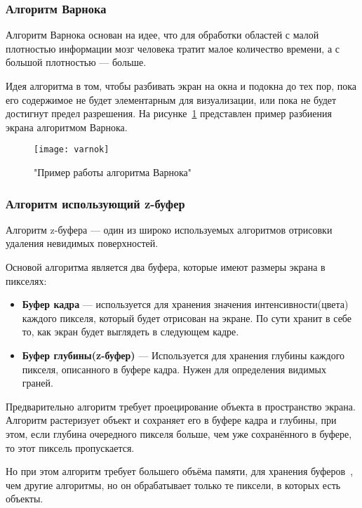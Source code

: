 \subsubsection{Алгоритм Варнока}

Алгоритм Варнока основан на идее, что для обработки областей с малой плотностью информации мозг человека тратит малое количество времени, а с большой плотностью — больше.

Идея алгоритма в том, чтобы разбивать экран на окна и подокна до тех пор, пока его содержимое не будет элементарным для визуализации, или пока не будет достигнут предел разрешения. На рисунке~\ref{fig:varnok} представлен пример разбиения экрана алгоритмом Варнока.

\begin{figure}[H]
	\centering
	\texttt{[image: varnok]}
	\caption{"Пример работы алгоритма Варнока"}
	\label{fig:varnok}
\end{figure}

\subsubsection{Алгоритм использующий z-буфер}
Алгоритм z-буфера — один из широко используемых алгоритмов отрисовки удаления невидимых поверхностей.

Основой алгоритма является два буфера, которые имеют размеры экрана в пикселях:

\begin{itemize}
	\item \textbf{Буфер кадра} — используется для хранения значения интенсивности(цвета) каждого пикселя, который будет отрисован на экране. По сути хранит в себе то, как экран будет выглядеть в следующем кадре.
	\item \textbf{Буфер глубины(z-буфер)} — Используется для хранения глубины каждого пикселя, описанного в буфере кадра. Нужен для определения видимых граней.
\end{itemize}

Предварительно алгоритм требует проецирование объекта в пространство экрана. Алгоритм растеризует объект и сохраняет его в буфере кадра и глубины, при этом, если глубина очередного пикселя больше, чем уже сохранённого в буфере, то этот пиксель пропускается.

Но при этом алгоритм требует большего объёма памяти, для хранения буферов~\cite{rodgers}, чем другие алгоритмы, но он обрабатывает только те пиксели, в которых есть объекты.


